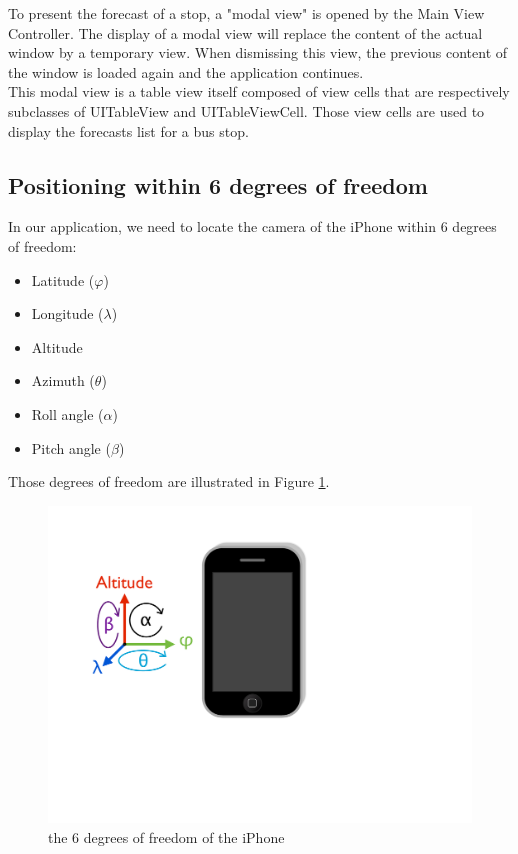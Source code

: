 To present the forecast of a stop, a "modal view" is opened by the Main View Controller.  The display of a modal view will replace the content of the actual window by a temporary view. When dismissing this view, the previous content of the window is loaded again and the application continues.\\

This modal view is a table view itself composed of view cells that are respectively subclasses of UITableView and UITableViewCell. Those view cells are used to display the forecasts list for a bus stop.

\subsection{Positioning within 6 degrees of freedom}

In our application, we need to locate the camera of the iPhone within 6 degrees of freedom:

\begin{itemize}
\item{Latitude ($\varphi$)}
\item{Longitude ($\lambda$)}
\item{Altitude}
\item{Azimuth ($\theta$)}
\item{Roll angle ($\alpha$)}
\item{Pitch angle ($\beta$)}
\end{itemize}

Those degrees of freedom are illustrated in Figure \ref{fig:iphone_orientation}.

\begin{figure}[ht]
\center
\includegraphics[scale=0.5]{pics/iphone_orientation}
\caption{the 6 degrees of freedom of the iPhone}
\label{fig:iphone_orientation}
\end{figure}

